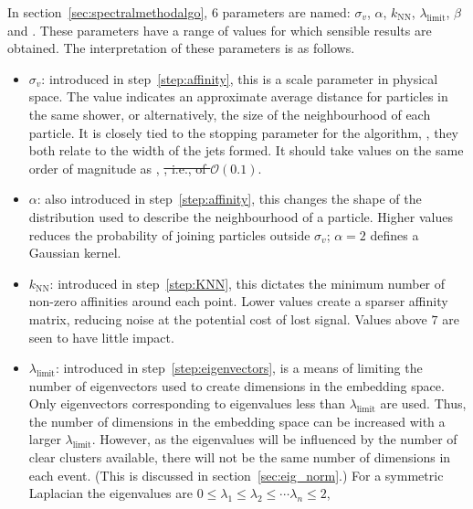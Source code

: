 In section~\ref{sec:spectralmethodalgo}, 6 parameters are named:
\(\sigma_v\), \(\alpha\), \(k_\text{NN}\), \(\lambda_\text{limit}\), \(\beta\) and \stoppingdeltar{}.
These parameters have a range of values for which sensible results are obtained.
The interpretation of these parameters is as follows.
\begin{itemize}
    \item \(\sigma_v\): introduced in step~\ref{step:affinity}, this is a scale parameter in physical space.
                      The value indicates an approximate average distance for particles in the same shower,
                      or alternatively, the size of the neighbourhood of each particle.
                      It is closely tied to the stopping parameter for the \genkt{} algorithm,
                      \ktstoppingdeltar{},
                      they both relate to the width of the jets formed.
                      It should take values on the same order of magnitude as \ktstoppingdeltar{},
                      \sout{, i.e.,  of \(\mathcal{O} (0.1)\)}.
    \item  \(\alpha\): also introduced in step~\ref{step:affinity},
           this changes the shape of the distribution used to describe the neighbourhood of a particle.
           Higher values reduces the probability of joining particles outside \(\sigma_v\);
           \(\alpha=2\) defines a Gaussian kernel.
       \item \(k_\text{NN}\): introduced in step~\ref{step:KNN}, this dictates the minimum number of non-zero affinities around each point.
           Lower values create a sparser affinity matrix, reducing noise at the potential cost of lost signal.
           Values above \(7\) are seen to have little impact.
       \item  \(\lambda_\text{limit}\): introduced in step~\ref{step:eigenvectors}, is a means of limiting the number of eigenvectors used
           to create dimensions in the embedding space.
           Only eigenvectors corresponding to eigenvalues less than \(\lambda_\text{limit}\) are used.
           Thus, the number of dimensions in the embedding space can be increased with a larger \(\lambda_\text{limit}\). 
           However, as the eigenvalues will be influenced by the number of clear clusters available, 
           there will not be the same number of dimensions in each event.
           (This is discussed in section~\ref{sec:eig_norm}.)
           For a symmetric Laplacian the eigenvalues are \(0 \leq \lambda_1 \leq \lambda_2 \leq \cdots \lambda_n \leq 2\),

\end{itemize}
